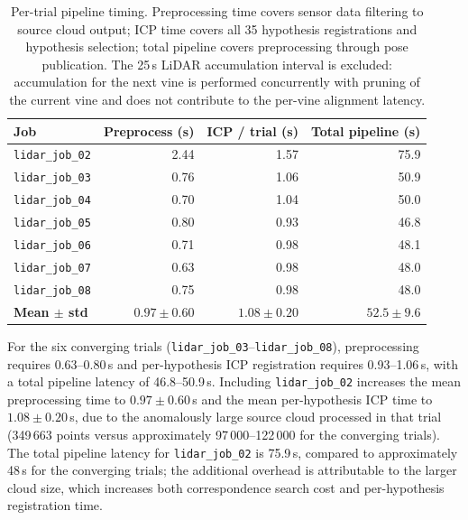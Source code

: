 \begin{table}[htbp]
  \centering
  \caption{Per-trial pipeline timing. Preprocessing time covers sensor data filtering to source cloud output; ICP time covers all 35 hypothesis registrations and hypothesis selection; total pipeline covers preprocessing through pose publication. The 25\,s LiDAR accumulation interval is excluded: accumulation for the next vine is performed concurrently with pruning of the current vine and does not contribute to the per-vine alignment latency.}
  \label{tab:pa-results-timing}
  \begin{tabularx}{\textwidth}{l r r r}
    \toprule
    \textbf{Job} &
    \textbf{Preprocess (s)} &
    \textbf{ICP / trial (s)} &
    \textbf{Total pipeline (s)} \\
    \midrule
    \texttt{lidar\_job\_02} & 2.44 & 1.57 & 75.9 \\
    \texttt{lidar\_job\_03} & 0.76 & 1.06 & 50.9 \\
    \texttt{lidar\_job\_04} & 0.70 & 1.04 & 50.0 \\
    \texttt{lidar\_job\_05} & 0.80 & 0.93 & 46.8 \\
    \texttt{lidar\_job\_06} & 0.71 & 0.98 & 48.1 \\
    \texttt{lidar\_job\_07} & 0.63 & 0.98 & 48.0 \\
    \texttt{lidar\_job\_08} & 0.75 & 0.98 & 48.0 \\
    \midrule
    \textbf{Mean $\pm$ std} & $0.97 \pm 0.60$ & $1.08 \pm 0.20$ & $52.5 \pm 9.6$ \\
    \bottomrule
  \end{tabularx}
\end{table}

For the six converging trials (\texttt{lidar\_job\_03}--\texttt{lidar\_job\_08}), preprocessing requires 0.63--0.80\,s and per-hypothesis ICP registration requires 0.93--1.06\,s, with a total pipeline latency of 46.8--50.9\,s. Including \texttt{lidar\_job\_02} increases the mean preprocessing time to $0.97 \pm 0.60$\,s and the mean per-hypothesis ICP time to $1.08 \pm 0.20$\,s, due to the anomalously large source cloud processed in that trial (349\,663 points versus approximately 97\,000--122\,000 for the converging trials). The total pipeline latency for \texttt{lidar\_job\_02} is 75.9\,s, compared to approximately 48\,s for the converging trials; the additional overhead is attributable to the larger cloud size, which increases both correspondence search cost and per-hypothesis registration time.

